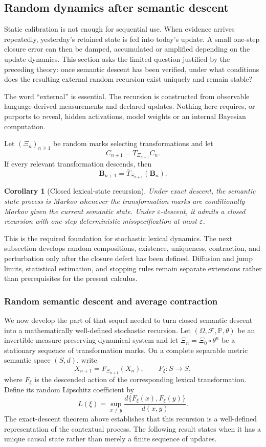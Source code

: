 \documentclass[11pt]{article}
\newtheorem{corollary}[definition]{Corollary}
\newcommand{\Bmap}{\mathbf B}
\begin{document}
\subsection{Random dynamics after semantic descent}

Static calibration is not enough for sequential use.  When evidence arrives
repeatedly, yesterday's retained state is fed into today's update.  A small
one-step closure error can then be damped, accumulated or amplified depending
on the update dynamics.  This section asks the limited question justified by
the preceding theory: once semantic descent has been verified, under what
conditions does the resulting external random recursion exist uniquely and
remain stable?

The word ``external'' is essential.  The recursion is constructed from
observable language-derived measurements and declared updates.  Nothing here
requires, or purports to reveal, hidden activations, model weights or an
internal Bayesian computation.

Let $(\Xi_n)_{n\ge1}$ be random marks selecting transformations and let
\[
 C_{n+1}=T_{\Xi_{n+1}}C_n.
\]
If every relevant transformation descends, then
\[
 \Bmap_{n+1}=\overline T_{\Xi_{n+1}}(\Bmap_n).
\]

\begin{corollary}[Closed lexical-state recursion]\label{cor:closed}
Under exact descent, the semantic state process is Markov whenever the transformation marks are conditionally Markov given the current semantic state. Under $\varepsilon$-descent, it admits a closed recursion with one-step deterministic misspecification at most $\varepsilon$.
\end{corollary}

This is the required foundation for stochastic lexical dynamics. The next
subsection develops random compositions, existence, uniqueness, contraction,
and perturbation only after the closure defect has been defined. Diffusion and
jump limits, statistical estimation, and stopping rules remain separate
extensions rather than prerequisites for the present calculus.

\subsubsection{Random semantic descent and average contraction}

We now develop the part of that sequel needed to turn closed semantic descent
into a mathematically well-defined stochastic recursion.  Let
$(\Omega,\mathcal F,\mathbb P,\theta)$ be an invertible
measure-preserving dynamical system and let $\Xi_n=\Xi_0\circ\theta^n$ be a
stationary sequence of transformation marks.  On a complete separable metric
semantic space $(S,d)$, write
\[
 X_{n+1}=F_{\Xi_{n+1}}(X_n),\qquad F_\xi:S\to S,
\]
where $F_\xi$ is the descended action of the corresponding lexical
transformation.  Define its random Lipschitz coefficient by
\[
 L(\xi)=\sup_{x\ne y}\frac{d\{F_\xi(x),F_\xi(y)\}}{d(x,y)}.
\]
The exact-descent theorem above establishes that this recursion is a
well-defined representation of the contextual process.  The following result
states when it has a unique causal state rather than merely a finite sequence
of updates.
\end{document}
